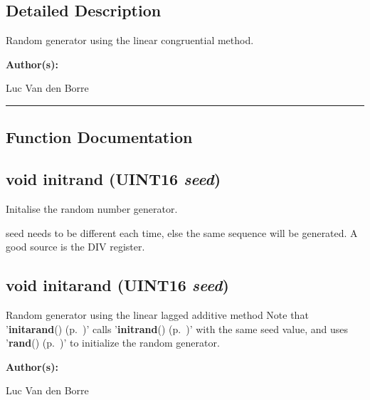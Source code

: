 \subsection*{Detailed Description}
Random generator using the linear congruential method.

\begin{Desc}
\item[{\bf Author(s): }]\par
Luc Van den Borre \end{Desc}
\vspace{0.4cm}\hrule\vspace{0.2cm}
\subsection*{Function Documentation}
\label{rand.h_a0}
\subsection{\setlength{\rightskip}{0pt plus 5cm}void initrand ({\bf UINT16} {\em seed})}

Initalise the random number generator.

seed needs to be different each time, else the same sequence will be generated. A good source is the DIV register. \label{rand.h_a3}
\subsection{\setlength{\rightskip}{0pt plus 5cm}void initarand ({\bf UINT16} {\em seed})}

Random generator using the linear lagged additive method Note that '{\bf initarand}() {\rm (p.~\pageref{rand.h_a3})}' calls '{\bf initrand}() {\rm (p.~\pageref{rand.h_a0})}' with the same seed value, and uses '{\bf rand}() {\rm (p.~\pageref{rand.h_a1})}' to initialize the random generator.

\begin{Desc}
\item[{\bf Author(s): }]\par
Luc Van den Borre \end{Desc}
